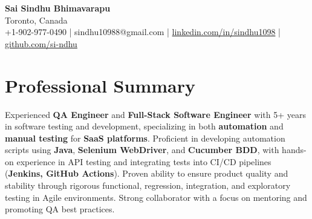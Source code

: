 \documentclass[letterpaper,11pt]{article}
\begin{document}
\begin{center}
  {\Large \textbf{Sai Sindhu Bhimavarapu}} \\
  Toronto, Canada \\
  +1-902-977-0490 \enspace | \enspace sindhu10988@gmail.com \enspace | \enspace \href{https://www.linkedin.com/in/sindhu1098/}{linkedin.com/in/sindhu1098} \enspace | \enspace \href{https://github.com/si-ndhu}{github.com/si-ndhu}
\end{center}

\section{Professional Summary}
  \begin{itemize}[leftmargin=0.15in, label={}]
    \small{\item{
     Experienced \textbf{QA Engineer} and \textbf{Full-Stack Software Engineer} with 5+ years in software testing and development, specializing in both \textbf{automation} and \textbf{manual testing} for \textbf{SaaS platforms}. Proficient in developing automation scripts using \textbf{Java}, \textbf{Selenium WebDriver}, and \textbf{Cucumber BDD}, with hands-on experience in API testing and integrating tests into CI/CD pipelines (\textbf{Jenkins, GitHub Actions}). Proven ability to ensure product quality and stability through rigorous functional, regression, integration, and exploratory testing in Agile environments. Strong collaborator with a focus on mentoring and promoting QA best practices.
    }}
  \end{itemize}
\vspace{-16pt}

\end{document}
